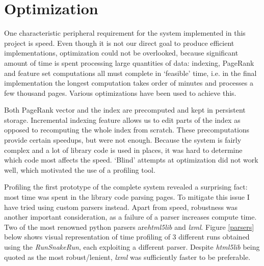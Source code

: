\documentclass[12pt,notitlepage,twoside]{scrreprt}
\begin{document}
\section{Optimization}

One characteristic peripheral requirement for the system implemented in this
project is speed.  Even though it is not our direct goal to produce efficient
implementations, optimization could not be overlooked, because significant
amount of time is spent processing large quantities of data: indexing, PageRank
and feature set computations all must complete in `feasible' time, i.e. in the
final implementation the longest computation takes order of minutes and
processes a few thousand pages. Various optimizations have been used to achieve
this. 

Both PageRank vector and the index are precomputed and kept in
persistent storage. Incremental indexing feature allows us to edit parts of the
index as opposed to recomputing the whole index from scratch. These
precomputations provide certain speedups, but were not enough.  Because the
system is fairly complex and a lot of library code is used in places, it was
hard to determine which code most affects the speed. `Blind' attempts at
optimization did not work well, which motivated the use of a profiling tool.

Profiling the first prototype of the complete system revealed a surprising
fact: most time was spent in the library code parsing pages. To mitigate this
issue I have tried using custom parsers instead. Apart from speed, robustness
was another important consideration, as a failure of a parser increases compute
time. Two of the most renowned python parsers are\textit{html5lib} and
\textit{lxml}.  Figure
\ref{parsers} below shows visual representation of time profiling of 3
different runs obtained using the \textit{RunSnakeRun}, each exploiting a
different parser.  Despite \textit{html5lib} being quoted as the most
robust/lenient, \textit{lxml} was sufficiently faster to be preferable.
\end{document}
